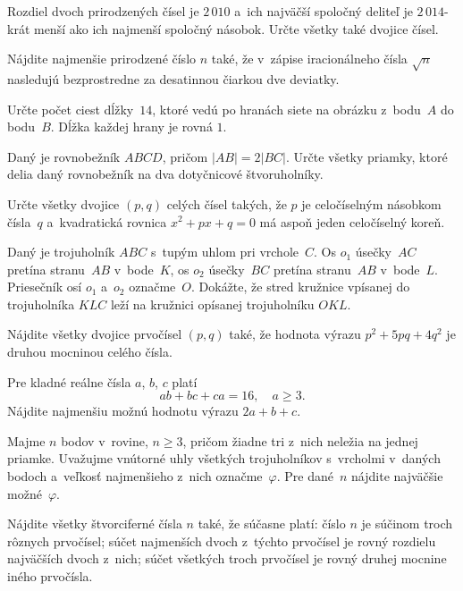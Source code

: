 {%
Rozdiel dvoch prirodzených čísel je $2\,010$ a~ich
najväčší spoločný deliteľ je $2\,014$-krát menší ako ich
najmenší spoločný násobok. Určte všetky také dvojice čísel.}

{%
Nájdite najmenšie prirodzené číslo $n$ také, že v~zápise iracionálneho
čísla $\sqrt n$ nasledujú bezprostredne za desatinnou čiarkou dve
deviatky.}

{%
Určte počet ciest dĺžky~$14$, ktoré vedú po hranách siete na \ifobrazkyvedla{}obrázku\else{}\obr{}\fi{}
z~bodu~$A$ do bodu~$B$. Dĺžka každej hrany je rovná $1$.
\ifobrazkyvedla{}\else{}\fi%
}

{%
Daný je rovnobežník $ABCD$, pričom $|AB|=2|BC|$. Určte
všetky priamky, ktoré delia daný rovnobežník na dva dotyčnicové štvoruholníky.}

{%
Určte všetky dvojice $(p,q)$ celých čísel takých, že $p$
je celočíselným násobkom čísla~$q$ a~kvadratická rovnica
$x^2+px+q=0$ má aspoň jeden celočíselný koreň.}

{%
Daný je trojuholník $ABC$ s~tupým uhlom pri vrchole~$C$. Os $o_1$
úsečky~$AC$ pretína stranu~$AB$ v~bode~$K$, os $o_2$ úsečky~$BC$ pretína
stranu~$AB$ v~bode~$L$. Priesečník osí $o_1$ a~$o_2$ označme~$O$. Dokážte,
že stred kružnice vpísanej do trojuholníka $KLC$ leží na kružnici opísanej
trojuholníku $OKL$.}

{%
Nájdite všetky dvojice prvočísel $(p,q)$ také, že hodnota výrazu
$p^2+5pq+4q^2$ je druhou mocninou celého čísla.}

{%
Pre kladné reálne čísla $a$, $b$, $c$ platí
$$
ab + bc + ca = 16,\quad a\ge3.
$$
Nájdite najmenšiu možnú hodnotu výrazu $2a + b + c$.}

{%
Majme $n$ bodov v~rovine, $n\ge3$, pričom žiadne tri z~nich neležia na jednej priamke.
Uvažujme vnútorné uhly všetkých trojuholníkov s~vrcholmi
v~daných bodoch a~veľkosť najmenšieho z~nich označme~$\varphi$.
Pre dané~$n$ nájdite najväčšie možné~$\varphi$.}

{%
Nájdite všetky štvorciferné čísla $n$ také, že súčasne platí:
 číslo $n$ je súčinom troch rôznych prvočísel;
 súčet najmenších dvoch z~týchto prvočísel je rovný rozdielu
najväčších dvoch z~nich;
 súčet všetkých troch prvočísel je rovný druhej mocnine iného
prvočísla.
}

